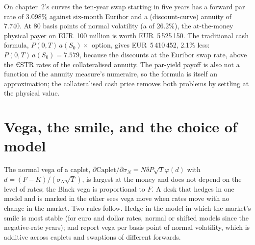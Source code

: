 \label{lst:rc:vanilla-rates-options:cash}

\begin{example}\label{ex:rc:vanilla-rates-options:swaption}
On chapter~2's curves the ten-year swap starting in five years has a forward
par rate of 3.098\% against six-month Euribor and a (discount-curve) annuity of
7.740. At 80 basis points of normal volatility (a  of
26.2\%), the at-the-money physical payer on EUR~100 million is worth
EUR~5\,525\,150. The traditional cash formula, $P(0,T)\,a(S_0)\times$ option,
gives EUR~5\,410\,452, 2.1\% less: $P(0,T)\,a(S_0) = 7.579$, because the  discounts at the Euribor swap rate, above the €STR rates of the
collateralised annuity. The par-yield payoff is also not a function of the
annuity measure's numeraire, so the formula is itself an approximation; the
collateralised cash price removes both problems by settling at the physical
value.
\end{example}

\section{Vega, the smile, and the choice of model}

The normal vega of a caplet, $\partial\mathrm{Caplet}/\partial\sigma_N =
N\delta P\sqrt T\varphi(d)$ with $d=(F-K)/(\sigma_N\sqrt T)$, is largest at the
money and does not depend on the level of rates; the Black vega is
proportional to $F$. A desk that hedges in one model and is marked in the other
sees vega move when rates move with no change in the market. Two rules follow.
Hedge in the model in which the market's smile is most stable (for euro and
dollar rates, normal or shifted models since the negative-rate years); and
report vega per basis point of normal volatility, which is additive across
caplets and swaptions of different forwards.

